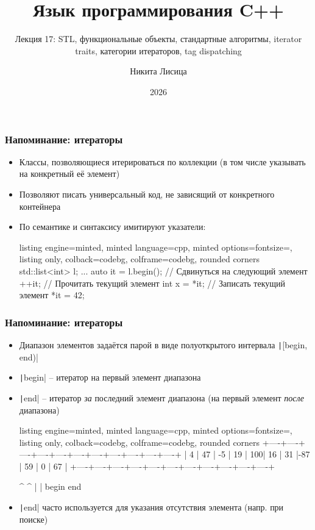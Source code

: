 \documentclass[10pt]{beamer}
\title{Язык программирования C++}
\subtitle{Лекция 17: STL, функциональные объекты, стандартные алгоритмы, iterator traits, категории итераторов, tag dispatching}
\date{2026}
\author{Никита Лисица}
\begin{document}
\frame{\titlepage}

\begin{frame}[fragile]
\frametitle{Напоминание: итераторы}
\begin{itemize}
\item Классы, позволяющиеся итерироваться по коллекции (в том числе указывать на конкретный её элемент)
\pause
\item Позволяют писать универсальный код, не зависящий от конкретного контейнера
\pause
\item По семантике и синтаксису имитируют указатели:
\begin{tcblisting}{listing engine=minted, minted language=cpp, minted options={fontsize=\scriptsize}, listing only, colback=codebg, colframe=codebg, rounded corners}
std::list<int> l;
...
auto it = l.begin();
// Сдвинуться на следующий элемент
++it;
// Прочитать текущий элемент
int x = *it;
// Записать текущий элемент
*it = 42;
\end{tcblisting}
\end{itemize}
\end{frame}

\begin{frame}[fragile]
\frametitle{Напоминание: итераторы}
\begin{itemize}
\item Диапазон элементов задаётся парой в виде полуоткрытого интервала \texttt|[begin, end)|
\pause
\item \texttt|begin| -- итератор на первый элемент диапазона
\pause
\item \texttt|end| -- итератор \textit{за} последний элемент диапазона (на первый элемент \textit{после} диапазона)
\pause
{}
\begin{tcblisting}{listing engine=minted, minted language=cpp, minted options={fontsize=\scriptsize}, listing only, colback=codebg, colframe=codebg, rounded corners}
+----+----+----+----+----+----+----+----+----+----+----+
|  4 | 47 | -5 | 19 | 100| 16 | 31 |-87 | 59 |  0 | 67 |
+----+----+----+----+----+----+----+----+----+----+----+

^                                                      ^
|                                                      |
begin                                                  end
\end{tcblisting}
\pause
{}
\item \texttt|end| часто используется для указания отсутствия элемента (напр. при поиске)
\end{itemize}
\end{frame}
\end{document}
